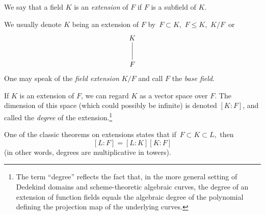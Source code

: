 \documentclass[12pt]{article}
\begin{document}
We say that a field $K$ is an \emph{extension} of $F$ if $F$ is a subfield of $K$.

We usually denote $K$ being an extension of $F$ by \,$F\subset K$, \,$F\le K$, \,$K/F$\, or
$$
\xymatrix{
K \ar@{-}[d] \\
F
}
$$
One may speak of the {\em field extension} $K/F$ and call $F$ the {\em base field}.

If $K$ is an extension of $F$, we can regard $K$ as a vector space over $F$. The dimension of this space (which could possibly be infinite) is denoted $[K:F]$, and called the {\em degree} of the extension.\footnote{The term ``degree'' reflects the fact that, in the more general setting of Dedekind domains and scheme-theoretic algebraic curves, the degree of an extension of function fields equals the algebraic degree of the polynomial defining the projection map of the underlying curves.}

One of the classic theorems on extensions states that if \,$F\subset K\subset L$, \,then
$$[L:F]=[L:K][K:F]$$
(in other words, degrees are multiplicative in towers).
\end{document}
